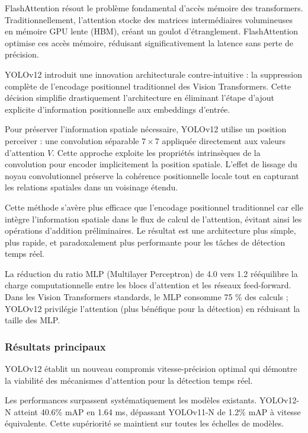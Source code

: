 FlashAttention \cite{dao_flashattention_2022} résout le problème fondamental d'accès mémoire des transformers. Traditionnellement, l'attention stocke des matrices intermédiaires volumineuses en mémoire GPU lente (HBM), créant un goulot d'étranglement. FlashAttention optimise ces accès mémoire, réduisant significativement la latence sans perte de précision.

YOLOv12 introduit une innovation architecturale contre-intuitive : la suppression complète de l'encodage positionnel traditionnel des Vision Transformers. Cette décision simplifie drastiquement l'architecture en éliminant l'étape d'ajout explicite d'information positionnelle aux embeddings d'entrée.

Pour préserver l'information spatiale nécessaire, YOLOv12 utilise un position perceiver : une convolution séparable $7 \times 7$ appliquée directement aux valeurs d'attention $V$. Cette approche exploite les propriétés intrinsèques de la convolution pour encoder implicitement la position spatiale. L'effet de lissage du noyau convolutionnel préserve la cohérence positionnelle locale tout en capturant les relations spatiales dans un voisinage étendu.

Cette méthode s'avère plus efficace que l'encodage positionnel traditionnel car elle intègre l'information spatiale dans le flux de calcul de l'attention, évitant ainsi les opérations d'addition préliminaires. Le résultat est une architecture plus simple, plus rapide, et paradoxalement plus performante pour les tâches de détection temps réel.

La réduction du ratio MLP (Multilayer Perceptron) de 4.0 vers 1.2 rééquilibre la charge computationnelle entre les blocs d'attention et les réseaux feed-forward. Dans les Vision Transformers standards, le MLP consomme 75 \% des calculs ; YOLOv12 privilégie l'attention (plus bénéfique pour la détection) en réduisant la taille des MLP.


\subsubsection{Résultats principaux}
YOLOv12 établit un nouveau compromis vitesse-précision optimal qui démontre la viabilité des mécanismes d'attention pour la détection temps réel.

Les performances surpassent systématiquement les modèles existants. YOLOv12-N atteint 40.6\% mAP en 1.64 ms, dépassant YOLOv11-N de 1.2\% mAP à vitesse équivalente. Cette supériorité se maintient sur toutes les échelles de modèles.

